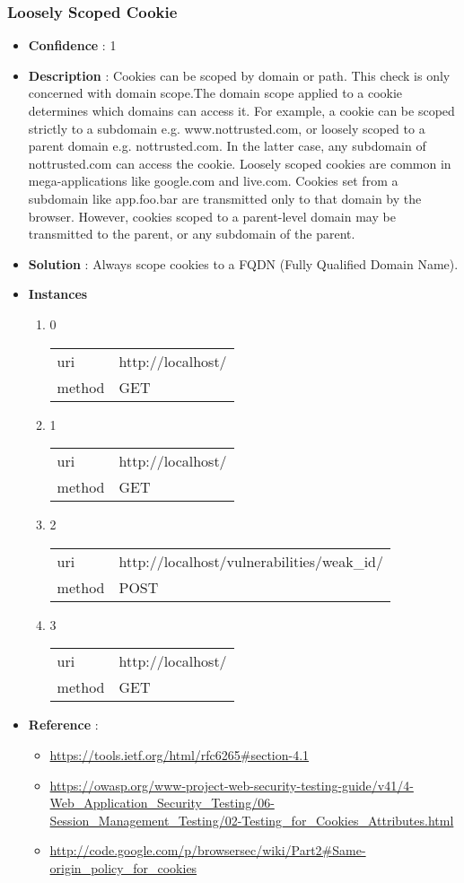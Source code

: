 \documentclass[10pt]{article}
\begin{document}
\subsubsection{Loosely Scoped Cookie}
\begin{itemize}
\item[] \textbf{Confidence} : 1
\item[] \textbf{Description} : Cookies can be scoped by domain or path. This check is only concerned with domain scope.The domain scope applied to a cookie determines which domains can access it. For example, a cookie can be scoped strictly to a subdomain e.g. www.nottrusted.com, or loosely scoped to a parent domain e.g. nottrusted.com. In the latter case, any subdomain of nottrusted.com can access the cookie. Loosely scoped cookies are common in mega-applications like google.com and live.com. Cookies set from a subdomain like app.foo.bar are transmitted only to that domain by the browser. However, cookies scoped to a parent-level domain may be transmitted to the parent, or any subdomain of the parent.
\item[] \textbf{Solution} :  Always scope cookies to a FQDN (Fully Qualified Domain Name).
\item[] \textbf{Instances}
\begin{enumerate}
\item[] 0
\begin{tabular}{| l | p{12cm}}
uri & http://localhost/ \\
method & GET \\
\end{tabular}
\item[] 1
\begin{tabular}{| l | p{12cm}}
uri & http://localhost/ \\
method & GET \\
\end{tabular}
\item[] 2
\begin{tabular}{| l | p{12cm}}
uri & http://localhost/vulnerabilities/weak\_id/ \\
method & POST \\
\end{tabular}
\item[] 3
\begin{tabular}{| l | p{12cm}}
uri & http://localhost/ \\
method & GET \\
\end{tabular}
\end{enumerate}
\item[] \textbf{Reference} : 
\begin{itemize}
\item \url{https://tools.ietf.org/html/rfc6265\#section-4.1}
\item \url{https://owasp.org/www-project-web-security-testing-guide/v41/4-Web\_Application\_Security\_Testing/06-Session\_Management\_Testing/02-Testing\_for\_Cookies\_Attributes.html}
\item \url{http://code.google.com/p/browsersec/wiki/Part2\#Same-origin\_policy\_for\_cookies}
\end{itemize}
\end{itemize}
\end{document}
